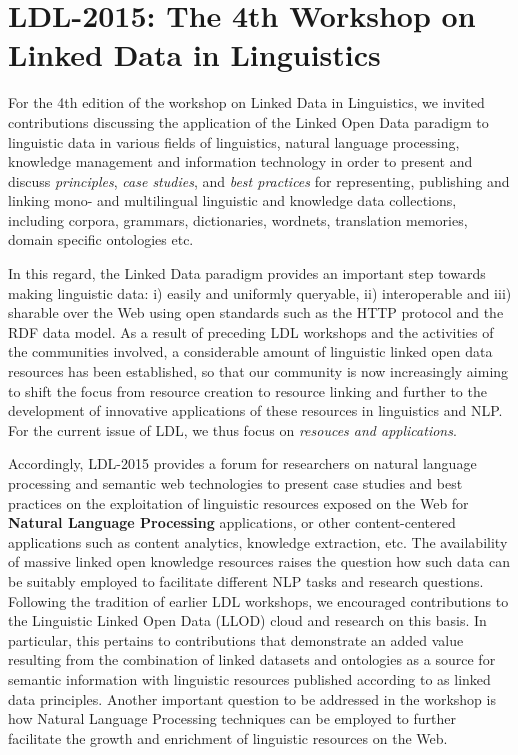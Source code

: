 \section{LDL-2015: The 4th Workshop on Linked Data in Linguistics}

For the 4th edition of the workshop on Linked Data in Linguistics, we invited contributions discussing the application of the Linked Open Data paradigm to linguistic data in various fields of linguistics, natural language processing, knowledge management and information technology in order to present and discuss \emph{principles}, \emph{case studies}, and \emph{best practices} for representing, publishing and linking mono- and multilingual linguistic and knowledge data collections, including corpora, grammars, dictionaries, wordnets, translation memories, domain specific ontologies etc. 

In this regard, the Linked Data paradigm provides an important step towards making linguistic data: 
i) easily and uniformly queryable, 
ii) interoperable and 
iii) sharable over the Web using open standards such as the HTTP protocol and the RDF data model. 
As a result of preceding LDL workshops and the activities of the communities involved, a considerable amount of linguistic linked open data resources has been established, so that our community is now increasingly aiming to shift the focus from resource creation to resource linking and further to the development of innovative applications of these resources in linguistics and NLP. For the current issue of LDL, we thus focus on \emph{resouces and applications}.

Accordingly, LDL-2015 provides a forum for researchers on natural language processing and semantic web technologies to present case studies and best practices on the exploitation of linguistic resources exposed on the Web for \textbf{Natural Language Processing} applications, or other content-centered applications such as content analytics, knowledge extraction, etc. The availability of massive linked open knowledge resources raises the question how such data can be suitably employed to facilitate different NLP tasks and research questions. Following the tradition of earlier LDL workshops, we encouraged contributions to the Linguistic Linked Open Data (LLOD) cloud and research on this basis. In particular, this pertains to contributions that demonstrate an added value resulting from the combination of linked datasets and ontologies as a source for semantic information with linguistic resources published according to as linked data principles. Another important question to be addressed in the workshop is how Natural Language Processing techniques can be employed to further facilitate the growth and enrichment of linguistic resources on the Web.


